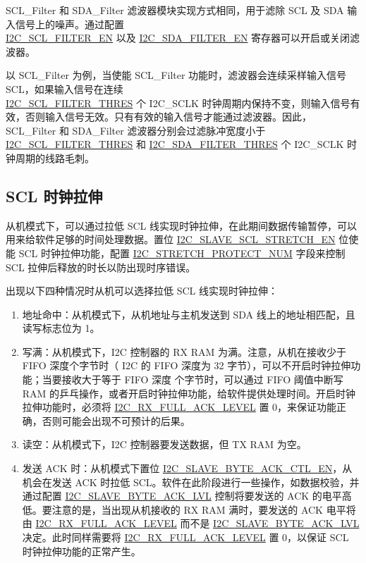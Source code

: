 \documentclass[main\_\_CN.tex]{subfiles}
\begin{document}
SCL\_Filter 和 SDA\_Filter 滤波器模块实现方式相同，用于滤除 SCL 及 SDA 输入信号上的噪声。通过配置\\\hyperref[fielddesc:I2CSCLFILTEREN]{I2C\_SCL\_FILTER\_EN} 以及 \hyperref[fielddesc:I2CSDAFILTEREN]{I2C\_SDA\_FILTER\_EN} 寄存器可以开启或关闭滤波器。

以 SCL\_Filter 为例，当使能 SCL\_Filter 功能时，滤波器会连续采样输入信号 SCL，如果输入信号在连续 \\\hyperref[fielddesc:I2CSCLFILTERTHRES]{I2C\_SCL\_FILTER\_THRES} 个 I2C\_SCLK 时钟周期内保持不变，则输入信号有效，否则输入信号无效。只有有效的输入信号才能通过滤波器。因此，SCL\_Filter 和 SDA\_Filter 滤波器分别会过滤脉冲宽度小于 \hyperref[fielddesc:I2CSCLFILTERTHRES]{I2C\_SCL\_FILTER\_THRES} 和 \hyperref[fielddesc:I2CSDAFILTERTHRES]{I2C\_SDA\_FILTER\_THRES} 个 I2C\_SCLK 时钟周期的线路毛刺。

\subsection{SCL 时钟拉伸}

从机模式下，可以通过拉低 SCL 线实现时钟拉伸，在此期间数据传输暂停，可以用来给软件足够的时间处理数据。置位 \hyperref[fielddesc:I2CSLAVESCLSTRETCHEN]{I2C\_SLAVE\_SCL\_STRETCH\_EN} 位使能 SCL 时钟拉伸功能，配置 \hyperref[fielddesc:I2CSTRETCHPROTECTNUM]{I2C\_STRETCH\_PROTECT\_NUM} 字段来控制 SCL 拉伸后释放的时长以防出现时序错误。

出现以下四种情况时从机可以选择拉低 SCL 线实现时钟拉伸：

\begin{enumerate}
\item 地址命中：从机模式下，从机地址与主机发送到 SDA 线上的地址相匹配，且读写标志位为 1。
\item 写满：从机模式下，I2C 控制器的 RX RAM 为满。注意，从机在接收少于 FIFO 深度个字节时（\chipname{} I2C 的 FIFO 深度为 32 字节），可以不开启时钟拉伸功能；当要接收大于等于 FIFO 深度 个字节时，可以通过 FIFO 阈值中断写 RAM 的乒乓操作，或者开启时钟拉伸功能，给软件提供处理时间。开启时钟拉伸功能时，必须将 \hyperref[fielddesc:I2CRXFULLACKLEVEL]{I2C\_RX\_FULL\_ACK\_LEVEL} 置 0，来保证功能正确，否则可能会出现不可预计的后果。
\item 读空：从机模式下，I2C 控制器要发送数据，但 TX RAM 为空。
\item 发送 ACK 时：从机模式下置位 \hyperref[fielddesc:I2CSLAVEBYTEACKCTLEN]{I2C\_SLAVE\_BYTE\_ACK\_CTL\_EN}，从机会在发送 ACK 时拉低 SCL。软件在此阶段进行一些操作，如数据校验，并通过配置 \hyperref[fielddesc:I2CSLAVEBYTEACKLVL]{I2C\_SLAVE\_BYTE\_ACK\_LVL} 控制将要发送的 ACK 的电平高低。要注意的是，当出现从机接收的 RX RAM 满时，要发送的 ACK 电平将由 \hyperref[fielddesc:I2CRXFULLACKLEVEL]{I2C\_RX\_FULL\_ACK\_LEVEL} 而不是 \hyperref[fielddesc:I2CSLAVEBYTEACKLVL]{I2C\_SLAVE\_BYTE\_ACK\_LVL} 决定。此时同样需要将 \hyperref[fielddesc:I2CRXFULLACKLEVEL]{I2C\_RX\_FULL\_ACK\_LEVEL} 置 0，以保证 SCL 时钟拉伸功能的正常产生。
\end{enumerate}
\end{document}
